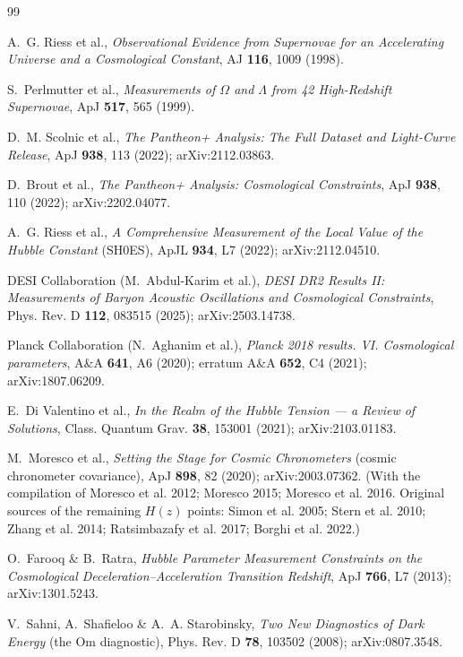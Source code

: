 \documentclass{article}
\begin{document}
\newpage
\begin{thebibliography}{99}

 A.~G. Riess et al., \textit{Observational Evidence from Supernovae for an Accelerating Universe and a Cosmological Constant}, AJ \textbf{116}, 1009 (1998).

 S.~Perlmutter et al., \textit{Measurements of $\Omega$ and $\Lambda$ from 42 High-Redshift Supernovae}, ApJ \textbf{517}, 565 (1999).

 D.~M. Scolnic et al., \textit{The Pantheon+ Analysis: The Full Dataset and Light-Curve Release}, ApJ \textbf{938}, 113 (2022); arXiv:2112.03863.

 D.~Brout et al., \textit{The Pantheon+ Analysis: Cosmological Constraints}, ApJ \textbf{938}, 110 (2022); arXiv:2202.04077.

 A.~G. Riess et al., \textit{A Comprehensive Measurement of the Local Value of the Hubble Constant} (SH0ES), ApJL \textbf{934}, L7 (2022); arXiv:2112.04510.

 DESI Collaboration (M.~Abdul-Karim et al.), \textit{DESI DR2 Results II: Measurements of Baryon Acoustic Oscillations and Cosmological Constraints}, Phys. Rev. D \textbf{112}, 083515 (2025); arXiv:2503.14738.

 Planck Collaboration (N.~Aghanim et al.), \textit{Planck 2018 results. VI. Cosmological parameters}, A\&A \textbf{641}, A6 (2020); erratum A\&A \textbf{652}, C4 (2021); arXiv:1807.06209.

 E.~Di Valentino et al., \textit{In the Realm of the Hubble Tension --- a Review of Solutions}, Class. Quantum Grav. \textbf{38}, 153001 (2021); arXiv:2103.01183.

 M.~Moresco et al., \textit{Setting the Stage for Cosmic Chronometers} (cosmic chronometer covariance), ApJ \textbf{898}, 82 (2020); arXiv:2003.07362. (With the compilation of Moresco et al. 2012; Moresco 2015; Moresco et al. 2016. Original sources of the remaining $H(z)$ points: Simon et al. 2005; Stern et al. 2010; Zhang et al. 2014; Ratsimbazafy et al. 2017; Borghi et al. 2022.)

 O.~Farooq \& B.~Ratra, \textit{Hubble Parameter Measurement Constraints on the Cosmological Deceleration--Acceleration Transition Redshift}, ApJ \textbf{766}, L7 (2013); arXiv:1301.5243.

 V.~Sahni, A.~Shafieloo \& A.~A. Starobinsky, \textit{Two New Diagnostics of Dark Energy} (the Om diagnostic), Phys. Rev. D \textbf{78}, 103502 (2008); arXiv:0807.3548.


\end{thebibliography}
\end{document}
